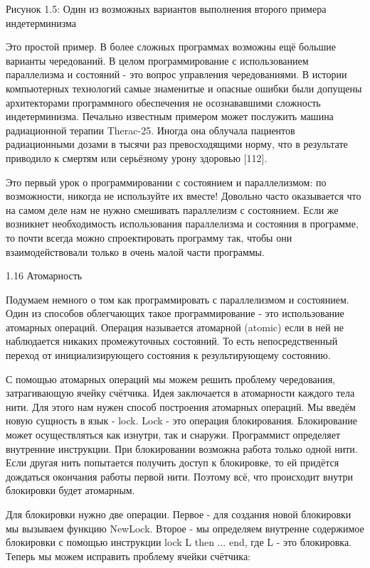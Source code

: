 Рисунок 1.5: Один из возможных вариантов выполнения второго примера индетерминизма

Это простой пример. В более сложных программах возможны ещё большие варианты чередований. В целом программирование с использованием параллелизма и состояний - это вопрос управления чередованиями. В истории компьютерных технологий самые знаменитые и опасные ошибки были допущены архитекторами программного обеспечения не осознававшими сложность индетерминизма. Печально известным примером может послужить машина радиационной терапии Therac-25. Иногда она облучала пациентов радиационными дозами в тысячи раз превосходящими норму, что в результате приводило к смертям или серьёзному урону здоровью [112].

Это первый урок о программировании с состоянием и параллелизмом: по возможности, никогда не используйте их вместе! Довольно часто оказывается что на самом деле нам не нужно смешивать параллелизм с состоянием. Если же возникнет необходимость использования параллелизма и состояния в программе, то почти всегда можно спроектировать программу так, чтобы они взаимодействовали только в очень малой части программы.

1.16 Атомарность

Подумаем немного о том как программировать с параллелизмом и состоянием. Один из способов облегчающих такое программирование - это использование атомарных операций. Операция называется атомарной (atomic) если в ней не наблюдается никаких промежуточных состояний. То есть непосредственный переход от инициализирующего состояния к результирующему состоянию.

С помощью атомарных операций мы можем решить проблему чередования, затрагивающую ячейку счётчика. Идея заключается в атомарности каждого тела нити. Для этого нам нужен способ построения атомарных операций. Мы введём новую сущность в язык - lock. Lock - это операция блокирования. Блокирование может осуществляться как изнутри, так и снаружи. Программист определяет внутренние инструкции. При блокировании возможна работа только одной нити. Если другая нить попытается получить доступ к блокировке, то ей придётся дождаться окончания работы первой нити. Поэтому всё, что происходит внутри блокировки будет атомарным.

Для блокировки нужно две операции. Первое - для создания новой блокировки мы вызываем функцию NewLock. Второе - мы определяем внутренне содержимое блокировки с помощью инструкции lock L then ... end, где L - это блокировка. Теперь мы можем исправить проблему ячейки счётчика:

